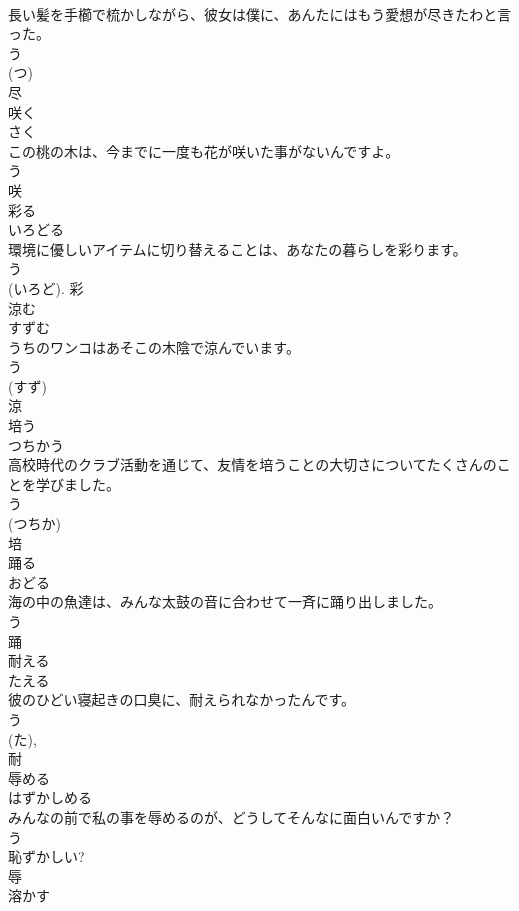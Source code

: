 \documentclass[8pt]{extreport}
\begin{document}
\begin{CJK}{UTF8}{min}
\\	長い髪を手櫛で梳かしながら、彼女は僕に、あんたにはもう愛想が尽きたわと言った。	
\\	う 
\\	(つ) 
\\	尽	
\\	咲く	
\\	さく	
\\	この桃の木は、今までに一度も花が咲いた事がないんですよ。	
\\	う 
\\	咲	
\\	彩る	
\\	いろどる	
\\	環境に優しいアイテムに切り替えることは、あなたの暮らしを彩ります。	
\\	う 
\\	(いろど).	彩	
\\	涼む	
\\	すずむ	
\\	うちのワンコはあそこの木陰で涼んでいます。	
\\	う 
\\	(すず) 
\\	涼	
\\	培う	
\\	つちかう	
\\	高校時代のクラブ活動を通じて、友情を培うことの大切さについてたくさんのことを学びました。	
\\	う 
\\	(つちか) 
\\	培	
\\	踊る	
\\	おどる	
\\	海の中の魚達は、みんな太鼓の音に合わせて一斉に踊り出しました。	
\\	う 
\\	踊	
\\	耐える	
\\	たえる	
\\	彼のひどい寝起きの口臭に、耐えられなかったんです。	
\\	う 
\\	(た), 
\\	耐	
\\	辱める	
\\	はずかしめる	
\\	みんなの前で私の事を辱めるのが、どうしてそんなに面白いんですか？	
\\	う 
\\	恥ずかしい? 
\\	辱	
\\	溶かす	

\end{CJK}
\end{document}
